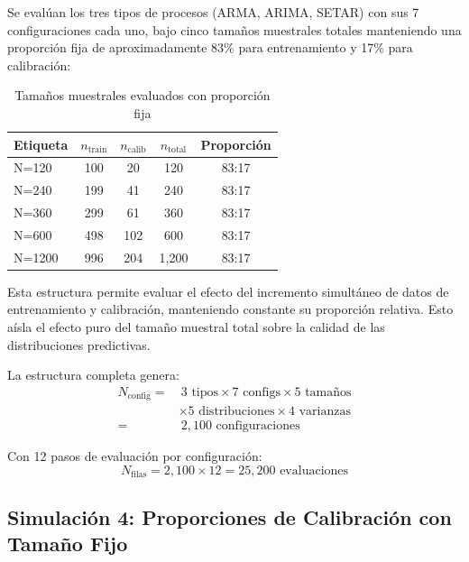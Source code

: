 Se evalúan los tres tipos de procesos (ARMA, ARIMA, SETAR) con sus 7 configuraciones cada uno, bajo cinco tamaños muestrales totales manteniendo una proporción fija de aproximadamente 83\% para entrenamiento y 17\% para calibración:

\begin{table}[htbp]
\centering
\caption{Tamaños muestrales evaluados con proporción fija}
\label{tab:combinaciones_muestrales}
\begin{tabular}{lcccc}
\toprule
\textbf{Etiqueta} & $n_{\text{train}}$ & $n_{\text{calib}}$ & $n_{\text{total}}$ & \textbf{Proporción} \\
\midrule
N=120 & 100 & 20 & 120 & 83:17 \\
N=240 & 199 & 41 & 240 & 83:17 \\
N=360 & 299 & 61 & 360 & 83:17 \\
N=600 & 498 & 102 & 600 & 83:17 \\
N=1200 & 996 & 204 & 1{,}200 & 83:17 \\
\bottomrule
\end{tabular}
\end{table}

Esta estructura permite evaluar el efecto del incremento simultáneo de datos de entrenamiento y calibración, manteniendo constante su proporción relativa. Esto aísla el efecto puro del tamaño muestral total sobre la calidad de las distribuciones predictivas.

La estructura completa genera:
\begin{equation}
\begin{split}
N_{\text{config}} = & \ 3 \text{ tipos} \times 7 \text{ configs} \times 5 \text{ tamaños} \\
& \times 5 \text{ distribuciones} \times 4 \text{ varianzas} \\
= & \ 2{,}100 \text{ configuraciones}
\end{split}
\end{equation}

Con 12 pasos de evaluación por configuración:
\begin{equation}
N_{\text{filas}} = 2{,}100 \times 12 = 25{,}200 \text{ evaluaciones}
\end{equation}



\subsection{Simulación 4: Proporciones de Calibración con Tamaño Fijo}
\label{subsec:sim4_proporciones}

